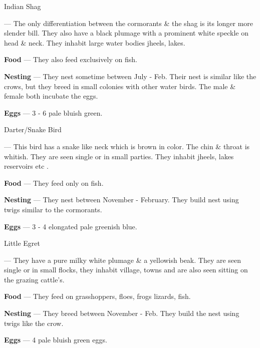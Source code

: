 \begin{bird}{Indian Shag}

 --- The only differentiation between the cormorants \& the shag is its longer more slender bill. They also have a black plumage with a prominent white speckle on head \& neck. They inhabit large water bodies jheels, lakes.

{\large\bf Food} --- They also feed exclusively on fish.

{\large\bf Nesting} --- They nest sometime between July - Feb. Their nest is similar like the crows, but they breed in small colonies with other water birds. The male \& female both incubate the eggs. 

{\large\bf Eggs} --- 3 - 6 pale bluish green.
\end{bird}

\begin{bird}{Darter/Snake Bird}

 --- This bird has a snake like neck which is brown in color. The chin \& throat is whitish. They are seen single or in small parties. They inhabit jheels, lakes reservoirs etc .

{\large\bf Food} --- They feed only on fish. 

{\large\bf Nesting} --- They nest between November - February. They build nest using twigs similar to the cormorants.

{\large\bf Eggs} --- 3 - 4 elongated pale greenish blue.
\end{bird}

\begin{bird}{Little Egret}

 --- They have a pure milky white plumage \& a yellowish beak. They are seen single or in small flocks, they inhabit village, towns and are also seen sitting on the grazing cattle's.

{\large\bf Food} --- They feed on grasshoppers, floes, frogs lizards, fish.

{\large\bf Nesting} --- They breed between November - Feb. They build the nest using twigs like the crow.

{\large\bf Eggs} --- 4 pale bluish green eggs.
\end{bird}

